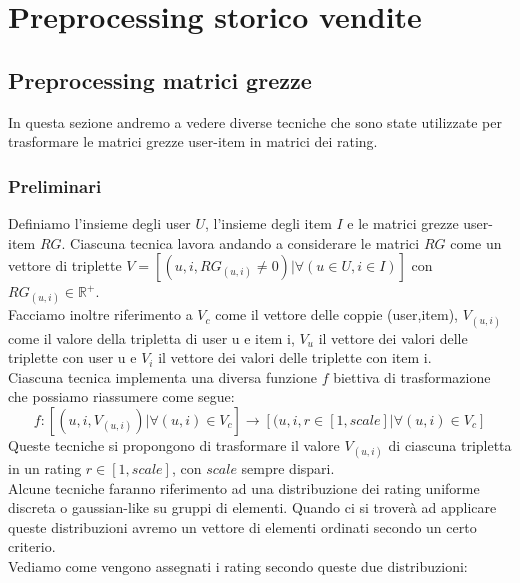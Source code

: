 
\hypertarget{(chap:capitolo4)}{}
\chapter{Preprocessing storico vendite}

\section{Preprocessing matrici grezze}
In questa sezione andremo a vedere diverse tecniche che sono state utilizzate per trasformare le matrici grezze user-item in matrici dei rating.\\

\subsection{Preliminari}
Definiamo l'insieme degli user $U$, l'insieme degli item $I$ e le matrici grezze user-item $RG$.
Ciascuna tecnica lavora andando a considerare le matrici $RG$ come un vettore di triplette $V = [(u, i, RG_{(u,i)} \neq 0) |  \forall (u \in U,i \in I)]$ con $RG_{(u,i)} \in \mathbb{R^+}$.\\
Facciamo inoltre riferimento a $V_c$ come il vettore delle coppie (user,item), $V_{(u,i)}$ come il valore della tripletta di user u e item i, $V_u$ il vettore dei valori delle triplette con user u e $V_i$ il vettore dei valori delle triplette con item i.\\
Ciascuna tecnica implementa una diversa funzione $f$ biettiva di trasformazione che possiamo riassumere come segue:
$$f: [(u, i, V_{(u,i)}) |  \forall (u,i) \in V_c] \rightarrow [(u, i, r \in [1,scale] | \forall (u,i) \in V_c]$$
Queste tecniche si propongono di trasformare il valore $V_{(u,i)}$ di ciascuna tripletta in un rating $r \in [1,scale]$, con $scale$ sempre dispari.\\ 
Alcune tecniche faranno riferimento ad una distribuzione dei rating uniforme discreta o gaussian-like su gruppi di elementi. Quando ci si troverà ad applicare queste distribuzioni avremo un vettore di elementi ordinati secondo un certo criterio.\\
Vediamo come vengono assegnati i rating secondo queste due distribuzioni:
